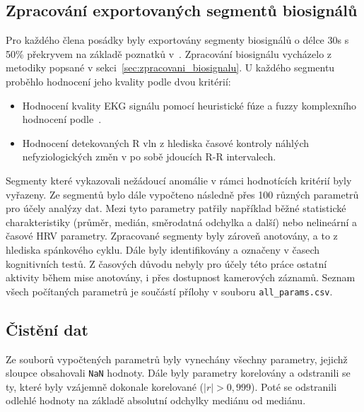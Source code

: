 \subsection{Zpracování exportovaných segmentů biosignálů}
\label{subsec:prezpracovani_segmentu}
Pro každého člena posádky byly exportovány segmenty biosignálů o délce 30s s
50\% překryvem na základě poznatků
v~\cite{Castaldo2019,Kim2021,Pecchia2018,Shaffer2020,Tervonen2021}. Zpracování
biosignálu vycházelo z metodiky popsané v sekci~\ref{sec:zpracovani_biosignalu}.
U každého segmentu proběhlo hodnocení jeho kvality podle dvou kritérií:
\begin{itemize}
      \item Hodnocení kvality \gls{EKG} signálu pomocí heuristické fúze a fuzzy
            komplexního hodnocení podle~\cite{Zhao2018}.
      \item Hodnocení detekovaných R vln z hlediska časové kontroly náhlých
            nefyziologických změn v po sobě jdoucích R-R intervalech.
\end{itemize}
Segmenty které vykazovali nežádoucí anomálie v rámci hodnotících kritérií byly
vyřazeny. Ze segmentů bylo dále vypočteno následně přes 100 různých parametrů
pro účely analýzy dat. Mezi tyto parametry patřily například běžné statistické
charakteristiky (průměr, medián, směrodatná odchylka a další) nebo nelineární a
časové \gls{HRV} parametry. Zpracované segmenty byly zároveň anotovány, a to z
hlediska spánkového cyklu. Dále byly identifikovány a označeny v časech
kognitivních testů. Z časových důvodu nebyly pro účely této práce ostatní
aktivity během mise anotovány, i přes dostupnost kamerových záznamů. Seznam
všech počítaných parametrů je součástí přílohy v souboru
\texttt{all\_params.csv}.

\subsection{Čistění dat}
\label{subsec:cisteni_dat}
Ze souborů vypočtených parametrů byly vynechány všechny parametry, jejichž
sloupce obsahovali \texttt{NaN} hodnoty. Dále byly parametry korelovány a
odstranili se ty, které byly vzájemně dokonale korelované ($|r| > 0,999$). Poté
se odstranili odlehlé hodnoty na základě absolutní odchylky mediánu od mediánu.

